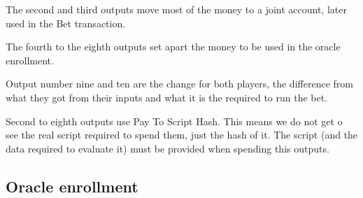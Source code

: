 The second and third outputs move most of the money to a joint account, later
  used in the Bet transaction.

The fourth to the eighth outputs set apart the money to be used in the oracle
  enrollment.

Output number nine and ten are the change for both players, the difference from
  what they got from their inputs and what it is the required to run the bet.

Second to eighth outputs use Pay To Script Hash.
This means we do not get o see the real script required to spend them, just the
  hash of it.
The script (and the data required to evaluate it) must be provided when spending
  this outputs.

\subsection{Oracle enrollment}

